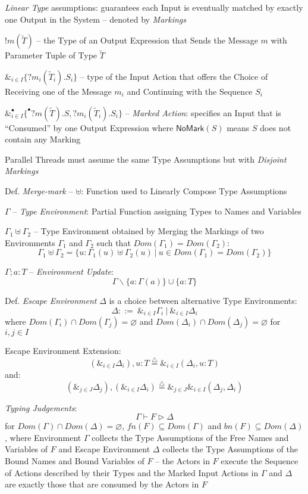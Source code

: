 \emph{Linear Type} assumptions: guarantees each Input is eventually
matched by exactly one Output in the System -- denoted by
\emph{Markings}

$!m(\tilde{T})$ -- the Type of an Output Expression that Sends the
Message $m$ with Parameter Tuple of Type $\tilde{T}$

$\&_{i \in I}\{ ?m_i(\tilde{T}_i).S_i \}$ -- type of the Input Action
that offers the Choice of Receiving one of the Message $m_i$ and
Continuing with the Sequence $S_i$

$\&^\bullet_{i \in I} \{^\bullet ?m (\tilde{T}).S,
?m_i(\tilde{T}_i).S_i \}$ -- \emph{Marked Action}: specifies an Input
that is ``Consumed'' by one Output Expression where
$\mathsf{NoMark}(S)$ means $S$ does not contain any Marking %

Parallel Threads must assume the same Type Assumptions but with
\emph{Disjoint Markings}

Def. \emph{Merge-mark} -- $\uplus$: Function used to Linearly Compose
Type Assumptions %

$\Gamma$ -- \emph{Type Environment}: Partial Function assigning Types
to Names and Variables

$\Gamma_1 \uplus \Gamma_2$ -- Type Environment obtained by Merging the
Markings of two Environments $\Gamma_1$ and $\Gamma_2$ such that
$Dom(\Gamma_1) = Dom(\Gamma_2)$:
\[
  \Gamma_1 \uplus \Gamma_2 =
    \{ u:\Gamma_1(u) \uplus \Gamma_2(u)
    \ |\ u \in Dom(\Gamma_1) = Dom(\Gamma_2) \}
\]

$\Gamma;a:T$ -- \emph{Environment Update}:
\[
  \Gamma \backslash \{a:\Gamma(a)\} \cup \{a:T\}
\]

Def. \emph{Escape Environment} $\Delta$ is a choice between
alternative Type Environments:
\[
  \Delta ::=\ \&_{i \in I}\Gamma_i \ |\ \&_{i \in I}\Delta_i
\]
where $Dom(\Gamma_i) \cap Dom(\Gamma_j) = \varnothing$ and
$Dom(\Delta_i) \cap Dom(\Delta_j) = \varnothing$ for $i,j \in I$

Escape Environment Extension:
\[
  (\&_{i \in I}\Delta_i), u:T \overset{\triangle}{=}
    \&_{i \in I}(\Delta_i, u:T)
\]
and:
\[
  (\&_{j \in J}\Delta_j), (\&_{i \in I}\Delta_i) \overset{\triangle}{=}
    \&_{j \in J}\&_{i \in I}(\Delta_j, \Delta_i)
\]

\emph{Typing Judgements}:
\[
  \Gamma \vdash F \rhd \Delta
\]
for $Dom(\Gamma) \cap Dom(\Delta) = \varnothing$, $fn(F) \subseteq
Dom(\Gamma)$ and $bn(F) \subseteq Dom(\Delta)$, where Environment
$\Gamma$ collects the Type Assumptions of the Free Names and Variables
of $F$ and Escape Environment $\Delta$ collects the Type Assumptions
of the Bound Names and Bound Variables of $F$ -- the Actors in $F$
execute the Sequence of Actions described by their Types and the
Marked Input Actions in $\Gamma$ and $\Delta$ are exactly those that
are consumed by the Actors in $F$

